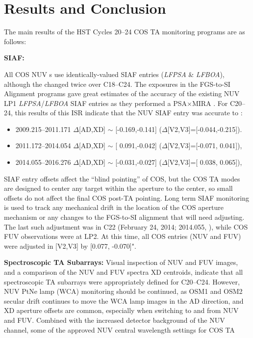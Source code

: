 \section{Results and Conclusion}\label{sec:results}
The main results of the HST Cycles 20--24 COS TA monitoring programs are as follows:
\begin{description}
\item{\bf SIAF:}{
	All COS NUV s use identically-valued SIAF entries ({\it LFPSA} \& {\it LFBOA}), although the changed twice over C18--C24.
	The exposures in the FGS-to-SI Alignment programs gave great estimates of the accuracy of the existing NUV LP1 {\it LFPSA}/{\it LFBOA} SIAF entries
	as they performed a PSA$\times$MIRA .
	For C20--24, this results of this ISR indicate that the NUV SIAF entry was accurate to :
	\begin{itemize}
	\item 2009.215--2011.171 $\Delta$[AD,XD] $\sim$ [-0.169,-0.141]\arcsec{} ($\Delta$[V2,V3]=[-0.044,-0.215]\arcsec{}).
	\item 2011.172--2014.054 $\Delta$[AD,XD] $\sim$ [ 0.091,-0.042]\arcsec{} ($\Delta$[V2,V3]=[-0.071, 0.041]\arcsec{}),
	\item 2014.055--2016.276 $\Delta$[AD,XD] $\sim$ [-0.031,-0.027]\arcsec{} ($\Delta$[V2,V3]=[ 0.038, 0.065]\arcsec{}),
	\end{itemize}
	SIAF entry offsets affect the ``blind pointing'' of COS, but the COS TA modes are designed to center any target within the aperture to the center, so small offsets do not affect the final COS post-TA pointing.
	Long term SIAF monitoring is used to track any mechanical drift in the location of the COS aperture mechanism or any changes to the FGS-to-SI alignment that will need adjusting.
	The last such adjustment was in C22 (February 24, 2014; 2014.055, ), while COS FUV observations were at LP2. At this time, all COS entries (NUV and FUV) were adjusted in [V2,V3] by [0.077, -0.070]".
}
\item{\bf Spectroscopic TA Subarrays:} {
	Visual inspection of NUV and FUV images, and a comparison of the NUV and FUV spectra XD centroids, indicate that all spectroscopic TA subarrays were appropriately defined for C20--C24.
	However, NUV PtNe lamp (WCA) monitoring should be continued, as OSM1 and OSM2 secular drift continues to move the WCA lamp images in the AD direction, and XD aperture offsets are common, especially when switching to and from NUV and FUV.
	Combined with the increased detector background of the NUV channel, some of the approved NUV central wavelength settings for COS TA
}
\end{description}
